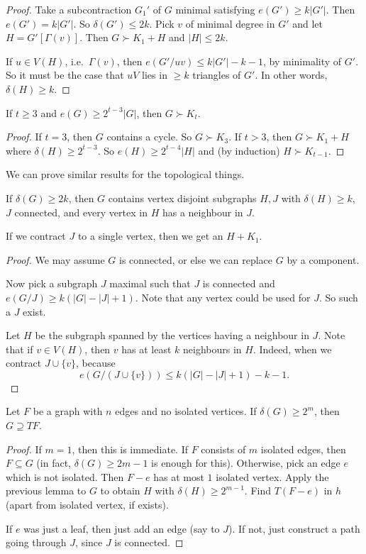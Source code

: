 \documentclass[a4paper]{article}
\begin{document}
\begin{proof}
  Take a subcontraction $G_1'$ of $G$ minimal satisfying $e(G') \geq k |G'|$. Then $e(G') = k |G'|$. So $\delta(G') \leq 2k$. Pick $v$ of minimal degree in $G'$ and let $H = G'[\Gamma(v)]$. Then $G \succ K_1 + H$ and $|H| \leq 2k$.

  If $u \in V(H)$, i.e.\ $\Gamma(v)$, then $e(G'/uv) \leq k|G'| - k - 1$, by minimality of $G'$. So it must be the case that $uV$ lies in $\geq k$ triangles of $G'$. In other words, $\delta(H) \geq k$.
\end{proof}

\begin{thm}
  If $t \geq 3$ and $e(G) \geq 2^{t - 3}|G|$, then $G \succ K_t$.
\end{thm}

\begin{proof}
  If $t = 3$, then $G$ contains a cycle. So $G \succ K_3$. If $t > 3$, then $G \succ K_1 + H$ where $\delta(H) \geq 2^{t - 3}$. So $e(H) \geq 2^{t - 4} |H|$ and (by induction) $H \succ K_{t - 1}$.
\end{proof}

We can prove similar results for the topological things.
\begin{lemma}
  If $\delta(G) \geq 2k$, then $G$ contains vertex disjoint subgraphs $H, J$ with $\delta(H) \geq k$, $J$ connected, and every vertex in $H$ has a neighbour in $J$.
\end{lemma}
If we contract $J$ to a single vertex, then we get an $H + K_1$.

\begin{proof}
  We may assume $G$ is connected, or else we can replace $G$ by a component.

  Now pick a subgraph $J$ maximal such that $J$ is connected and $e(G/J) \geq k(|G| - |J| + 1)$. Note that any vertex could be used for $J$. So such a $J$ exist.

  Let $H$ be the subgraph spanned by the vertices having a neighbour in $J$. Note that if $v \in V(H)$, then $v$ has at least $k$ neighbours in $H$. Indeed, when we contract $J \cup \{v\}$, because
  \[
    e(G/(J \cup \{v\})) \leq k(|G| - |J| + 1) - k - 1.
  \]
\end{proof}

\begin{thm}
  Let $F$ be a graph with $n$ edges and no isolated vertices. If $\delta(G) \geq 2^m$, then $G \supseteq TF$.
\end{thm}
\begin{proof}
  If $m = 1$, then this is immediate. If $F$ consists of $m$ isolated edges, then $F \subseteq G$ (in fact, $\delta(G) \geq 2m - 1$ is enough for this). Otherwise, pick an edge $e$ which is not isolated. Then $F - e$ has at most $1$ isolated vertex. Apply the previous lemma to $G$ to obtain $H$ with $\delta(H) \geq 2^{m - 1}$. Find $T(F - e)$ in $h$ (apart from isolated vertex, if exists).

  If $e$ was just a leaf, then just add an edge (say to $J$). If not, just construct a path going through $J$, since $J$ is connected.
\end{proof}
\end{document}
